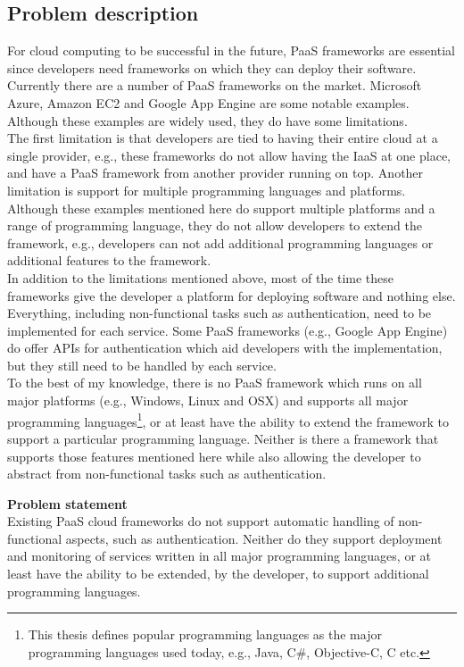 \documentclass[12pt,a4paper]{article}
\begin{document}
\subsection{Problem description}\label{subsec:ProblemDescription}
For cloud computing to be successful in the future, PaaS frameworks are essential since developers need frameworks on which they can deploy their software. \\
Currently there are a number of PaaS frameworks on the market. Microsoft Azure\cite{azure_website}, Amazon EC2\cite{ec2_website} and Google App Engine\cite{google_app_engine_website} are some notable examples. Although these examples are widely used, they do have some limitations. \\
The first limitation is that developers are tied to having their entire cloud at a single provider, e.g., these frameworks do not allow having the IaaS at one place, and have a PaaS framework from another provider running on top. Another limitation is support for multiple programming languages and platforms. Although these examples mentioned here do support multiple platforms and a range of programming language, they do not allow developers to extend the framework, e.g., developers can not add additional programming languages or additional features to the framework.\\
In addition to the limitations mentioned above, most of the time these frameworks give the developer a platform for deploying software and nothing else. Everything, including non-functional tasks such as authentication, need to be implemented for each service. Some PaaS frameworks (e.g., Google App Engine) do offer APIs for authentication which aid developers with the implementation, but they still need to be handled by each service.\\

To the best of my knowledge, there is no PaaS framework which runs on all major platforms (e.g., Windows, Linux and OSX) and supports all major programming languages\footnote{This thesis defines popular programming languages as the major programming languages used today, e.g., Java, C\#, Objective-C, C etc.}, or at least have the ability to extend the framework to support a particular programming language. Neither is there a framework that supports those features mentioned here while also allowing the developer to abstract from non-functional tasks such as authentication.\\

\begin{mdframed}
\textbf{Problem statement} \\
Existing PaaS cloud frameworks do not support automatic handling of non-functional aspects, such as authentication. Neither do they support deployment and monitoring of services written in all major programming languages, or at least have the ability to be extended, by the developer, to support additional programming languages.
\end{mdframed}
\end{document}
